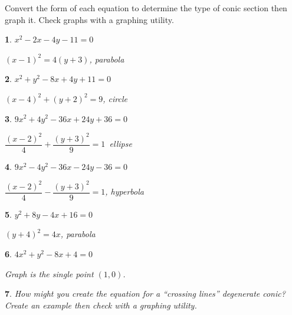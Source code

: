 \documentclass{amsbook}
\newtheorem{exc}{}
\newenvironment{ex}{\begin{exc}\normalfont}{\end{exc}}
\numberwithin{section}{chapter}
\numberwithin{equation}{chapter}
\begin{document}
Convert the form of each equation to determine the type of conic section then graph it. Check graphs with a graphing utility.

\begin{multicols}{2}
		
	\begin{ex}
		$x^2-2x-4y-11=0$
		\begin{sol}
			$(x-1)^2 = 4(y+3)$, parabola
		\end{sol}
	\end{ex}
	
	\begin{ex}
		$x^2 + y^2-8x+4y+11=0$
		\begin{sol}
			$(x-4)^2+(y+2)^2 = 9$, circle
		\end{sol}
	\end{ex}
		
\begin{ex}
	$9x^2 + 4y^2-36x+24y + 36=0$
	\begin{sol}
		$\dfrac{(x - 2)^{2}}{4} + \dfrac{(y + 3)^{2}}{9} = 1$\, ellipse
	\end{sol}
\end{ex}

\begin{ex}
	$9x^2-4y^2-36x-24y-36=0$
	\begin{sol}
		$\dfrac{(x - 2)^{2}}{4} - \dfrac{(y + 3)^{2}}{9} = 1$, hyperbola
	\end{sol}
\end{ex}
		
\begin{ex}
	$y^2+8y-4x+16=0$
	\begin{sol}
		$(y + 4)^{2} = 4x$, parabola
	\end{sol}
\end{ex}

\begin{ex}
	$4x^2+y^2-8x+4=0$
	\begin{sol}
		Graph is the single point $(1,0)$.
	\end{sol}
\end{ex}
\end{multicols}


\begin{ex}
	How might you create the equation for a ``crossing lines'' degenerate conic? Create an example then check with a graphing utility.
\end{ex}
\end{document}
